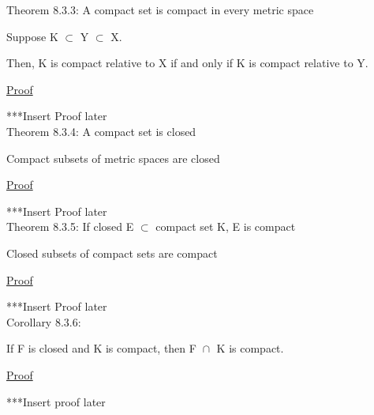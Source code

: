 \newpage

{ \color{red} Theorem 8.3.3: A compact set is compact in every metric space } 

	\begin{adjustbox}{minipage=14cm, right, vspace=0.2cm 0cm}
		Suppose K $\subset$ Y $\subset$ X.

		Then, K is compact relative to X if and only if K is
		compact relative to Y.
	\end{adjustbox}

{ \color{magenta} \underline{Proof} } 

	{\color{purple} ***Insert Proof later} \\

{ \color{red} Theorem 8.3.4: A compact set is closed } 

	\begin{adjustbox}{minipage=14cm, right, vspace=0.2cm 0cm}
		Compact subsets of metric spaces are closed
	\end{adjustbox}

{ \color{magenta} \underline{Proof} } 

	{\color{purple} ***Insert Proof later} \\

{ \color{red} Theorem 8.3.5: If closed E $\subset$ compact set K, E is compact } 

	\begin{adjustbox}{minipage=14cm, right, vspace=0.2cm 0cm}
		Closed subsets of compact sets are compact
	\end{adjustbox}

{ \color{magenta} \underline{Proof} } 

	{\color{purple} ***Insert Proof later} \\

{ \color{orange} Corollary 8.3.6: } 

	\begin{adjustbox}{minipage=14cm, right, vspace=0.1cm 0cm}
		If F is closed and K is compact, then F $\cap_{}^{}$ K is compact.
	\end{adjustbox}

{ \color{magenta} \underline{Proof} } 

	{\color{purple} ***Insert proof later}
































\subsection{}    

